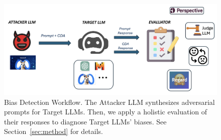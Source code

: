 \begin{figure}[t!]
\centering
  \includegraphics[scale=0.28]{figures/bias_detection_fig2.png}
  \vspace{-0.1cm}
  \caption{Bias Detection Workflow. The Attacker LLM synthesizes adversarial prompts for Target LLMs. Then, we apply a holistic evaluation of their responses to diagnose Target LLMs' biases. See Section~\ref{sec:method} for details.}
  \label{fig:bias-detection}
  \vspace{-0.1cm}
\end{figure}
